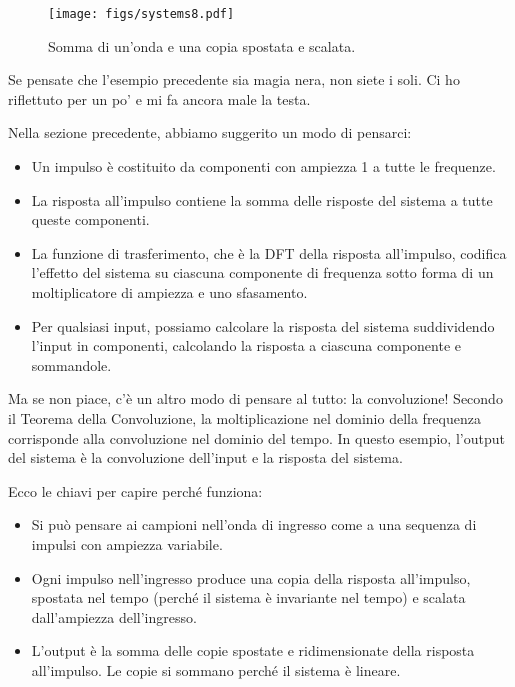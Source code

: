 \documentclass[12pt]{book} \usepackage[width=5.5in,height=8.5in, hmarginratio=3:2,vmarginratio=1:1]{geometry}
\begin{document}
\begin{figure} 

\centerline{\texttt{[image: figs/systems8.pdf]}} \caption{Somma di un'onda e una copia spostata e scalata.} \label{fig.systems8} \end{figure} 

Se pensate che l'esempio precedente sia magia nera, non siete i soli. Ci ho riflettuto per un po' e mi fa ancora male la testa.

Nella sezione precedente, abbiamo suggerito un modo di pensarci:

\begin{itemize} 

\item Un impulso è costituito da componenti con ampiezza 1 a tutte le frequenze.

\item La risposta all'impulso contiene la somma delle risposte del sistema a tutte queste componenti.

\item La funzione di trasferimento, che è la DFT della risposta all'impulso, codifica l'effetto del sistema su ciascuna componente di frequenza sotto forma di un moltiplicatore di ampiezza e uno sfasamento.

\item Per qualsiasi input, possiamo calcolare la risposta del sistema suddividendo l'input in componenti, calcolando la risposta a ciascuna componente e sommandole.

\end{itemize} 

Ma se non piace, c'è un altro modo di pensare al tutto: la convoluzione! Secondo il Teorema della Convoluzione, la moltiplicazione nel dominio della frequenza corrisponde alla convoluzione nel dominio del tempo. In questo esempio, l'output del sistema è la convoluzione dell'input e la risposta del sistema.

Ecco le chiavi per capire perché funziona:

\begin{itemize} 

\item Si può pensare ai campioni nell'onda di ingresso come a una sequenza di impulsi con ampiezza variabile.

\item Ogni impulso nell'ingresso produce una copia della risposta all'impulso, spostata nel tempo (perché il sistema è invariante nel tempo) e scalata dall'ampiezza dell'ingresso.

\item L'output è la somma delle copie spostate e ridimensionate della risposta all'impulso. Le copie si sommano perché il sistema è lineare.

\end{itemize} 
\end{document}
